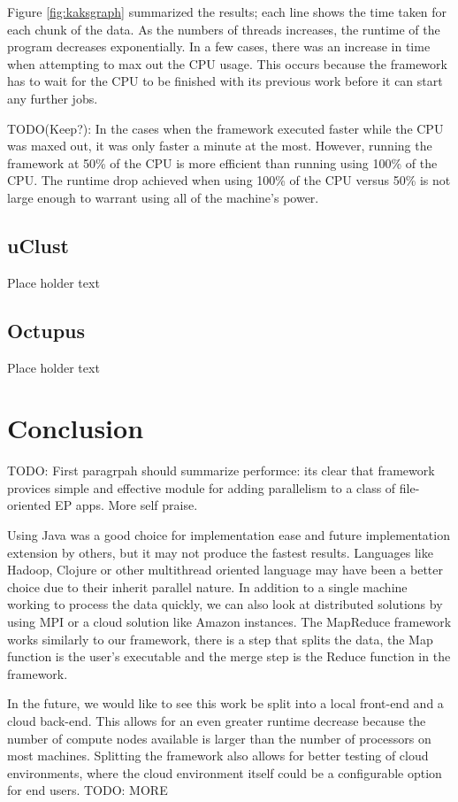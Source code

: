 \documentclass[12pt]{article}
\begin{document}
Figure \ref{fig:kaksgraph} summarized the results; each line shows the time taken for each chunk
of the data. As the numbers of threads increases, the runtime of the program
decreases exponentially. In a few cases, there was an increase in time when
attempting to max out the CPU usage. This occurs because the framework has to
wait for the CPU to be finished with its previous work before it can start any
further jobs. 

TODO(Keep?): In the cases when the framework executed faster while the CPU was 
maxed out, it was only faster a minute at the most. However, running the 
framework at 50\% of the CPU is more efficient than running using 100\% of the 
CPU. The runtime drop achieved when using 100\% of the CPU versus 50\% is not 
large enough to warrant using all of the machine's power.

\subsection{uClust}

Place holder text

\subsection{Octupus}

Place holder text

\section{Conclusion}

TODO: First paragrpah should summarize performce: its clear that framework
provices simple and effective module for adding parallelism to a class of
file-oriented EP apps. More self praise.

Using Java was a good choice for implementation ease and future implementation
extension by others, but it may not produce the fastest results. Languages like
Hadoop, Clojure or other multithread oriented language may have been a better
choice due to their inherit parallel nature. In addition to a single machine
working to process the data quickly, we can also look at distributed solutions
by using MPI or a cloud solution like Amazon instances. The MapReduce framework
works similarly to our framework, there is a step that splits the data, the Map
function is the user's executable and the merge step is the Reduce function in
the framework. 

In the future, we would like to see this work be split into a
local front-end and a cloud back-end. This allows for an even greater runtime
decrease because the number of compute nodes available is larger than the number
of processors on most machines. Splitting the framework also allows for better
testing of cloud environments, where the cloud environment itself could be a
configurable option for end users.
TODO: MORE
\end{document}
